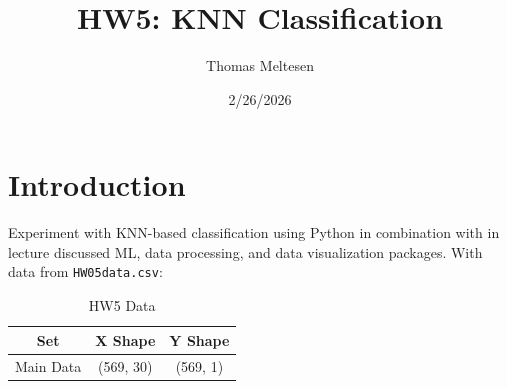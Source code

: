 \documentclass{article}
\title{HW5: KNN Classification}
\author{Thomas Meltesen}
\date{2/26/2026}
\begin{document}
\maketitle

\section{Introduction}
Experiment with KNN-based classification using Python in combination with in
lecture discussed ML, data processing, and data visualization packages. With data from \texttt{HW05\textunderscore data.csv}:
\begin{table}[ht]
\centering
\begin{tabular}{|c|c|c|}
\hline
Set & X Shape & Y Shape \\
\hline
Main Data   & (569, 30) & (569, 1) \\
\hline
\end{tabular}
\caption{HW5 Data}
\label{tab:data_split}
\end{table}
\end{document}
